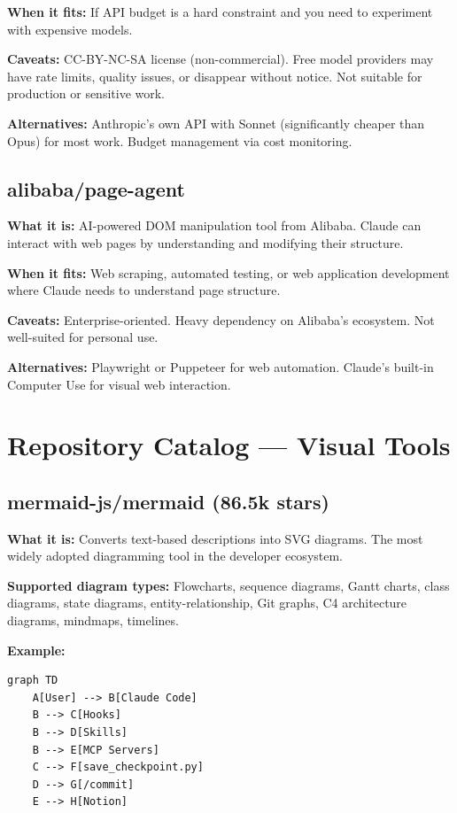 \documentclass[11pt,a4paper]{article}
\begin{document}
\textbf{When it fits:} If API budget is a hard constraint and you need to experiment with expensive models.

\textbf{Caveats:} CC-BY-NC-SA license (non-commercial). Free model providers may have rate limits, quality issues, or disappear without notice. Not suitable for production or sensitive work.

\textbf{Alternatives:} Anthropic's own API with Sonnet (significantly cheaper than Opus) for most work. Budget management via cost monitoring.

\subsection{alibaba/page-agent}

\textbf{What it is:} AI-powered DOM manipulation tool from Alibaba. Claude can interact with web pages by understanding and modifying their structure.

\textbf{When it fits:} Web scraping, automated testing, or web application development where Claude needs to understand page structure.

\textbf{Caveats:} Enterprise-oriented. Heavy dependency on Alibaba's ecosystem. Not well-suited for personal use.

\textbf{Alternatives:} Playwright or Puppeteer for web automation. Claude's built-in Computer Use for visual web interaction.

\newpage

\section{Repository Catalog --- Visual Tools}

\subsection{mermaid-js/mermaid (86.5k stars)}

\textbf{What it is:} Converts text-based descriptions into SVG diagrams. The most widely adopted diagramming tool in the developer ecosystem.

\textbf{Supported diagram types:} Flowcharts, sequence diagrams, Gantt charts, class diagrams, state diagrams, entity-relationship, Git graphs, C4 architecture diagrams, mindmaps, timelines.

\textbf{Example:}
\begin{lstlisting}
graph TD
    A[User] --> B[Claude Code]
    B --> C[Hooks]
    B --> D[Skills]
    B --> E[MCP Servers]
    C --> F[save_checkpoint.py]
    D --> G[/commit]
    E --> H[Notion]
\end{lstlisting}
\end{document}
